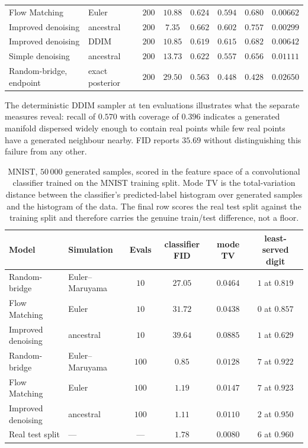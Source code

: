 \begin{table}[htbp]
\begin{center}
{\begin{tabular}{llcccccc}
Flow Matching             & Euler             & $200$ & $10.88$ & $0.624$ & $0.594$ & $0.680$ & $0.00662$\\
Improved denoising        & ancestral         & $200$ & $\mathbf{7.35}$ & $\mathbf{0.662}$ & $0.602$ & $\mathbf{0.757}$ & $\mathbf{0.00299}$\\
Improved denoising        & DDIM              & $200$ & $10.85$ & $0.619$ & $\mathbf{0.615}$ & $0.682$ & $0.00642$\\
Simple denoising          & ancestral         & $200$ & $13.73$ & $0.622$ & $0.557$ & $0.656$ & $0.01111$\\
Random-bridge, endpoint   & exact posterior   & $200$ & $29.50$ & $0.563$ & $0.448$ & $0.428$ & $0.02650$\\
\bottomrule
\end{tabular}}
\end{center}
\end{table}

The deterministic DDIM sampler at ten evaluations illustrates what the separate
measures reveal: recall of $0.570$ with coverage of $0.396$ indicates a
generated manifold dispersed widely enough to contain real points while few real
points have a generated neighbour nearby. FID reports $35.69$ without
distinguishing this failure from any other.

\begin{table}[htbp]
\begin{center}
\caption{MNIST, $50\,000$ generated samples, scored in the feature space of a
convolutional classifier trained on the MNIST training split. Mode TV is the
total-variation distance between the classifier's predicted-label histogram over
generated samples and the histogram of the data. The final row scores the real
test split against the training split and therefore carries the genuine
train/test difference, not a floor.}
\label{tab:cfid}
\vskip 0.1in
\begin{tabular}{llcccc}
\toprule
Model & Simulation & Evals & classifier FID & mode TV & least-served digit\\
\midrule
Random-bridge      & Euler--Maruyama & $10$ & $\mathbf{27.05}$ & $0.0464$ & $1$ at $0.819$\\
Flow Matching      & Euler           & $10$ & $31.72$ & $\mathbf{0.0438}$ & $0$ at $0.857$\\
Improved denoising & ancestral       & $10$ & $39.64$ & $0.0885$ & $1$ at $0.629$\\
\midrule
Random-bridge      & Euler--Maruyama & $100$ & $\mathbf{0.85}$ & $0.0128$ & $7$ at $0.922$\\
Flow Matching      & Euler           & $100$ & $1.19$ & $0.0147$ & $7$ at $0.923$\\
Improved denoising & ancestral       & $100$ & $1.11$ & $\mathbf{0.0110}$ & $2$ at $0.950$\\
\midrule
Real test split    & ---             & ---   & $1.78$ & $0.0080$ & $6$ at $0.960$\\
\bottomrule
\end{tabular}
\end{center}
\end{table}

